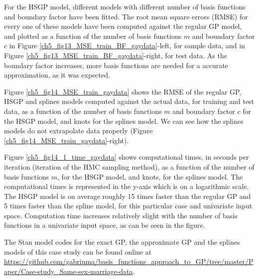 \documentclass[onecolumn,a4paper,11pt]{article}
\begin{document}
For the HSGP model, different models with different number of basis functions and boundary factor have been fitted. The root mean square errors (RMSE) for every one of these models have been computed against the regular GP model, and plotted as a function of the number of basis functions $m$ and boundary factor $c$ in Figure \ref{ch5_fig13_MSE_train_BF_gaydata}-left, for sample data, and in Figure \ref{ch5_fig13_MSE_train_BF_gaydata}-right, for test data. As the boundary factor increases, more basis functions are needed for a accurate approximation, as it was expected.

Figure \ref{ch5_fig14_MSE_train_gaydata} shows the RMSE of the regular GP, HSGP and splines models computed against the actual data, for training and test data, as a function of the number of basis functions $m$ and boundary factor $c$ for the HSGP model, and  knots for the splines model. We can see how the splines models do not extrapolate data properly (Figure \ref{ch5_fig14_MSE_train_gaydata}-right). 

Figure \ref{ch5_fig14_1_time_gaydata} shows computational times, in seconds per iteration (iteration of the HMC sampling method), as a function of the number of basis functions $m$, for the HSGP model, and knots, for the splines model. The computational times is represented in the y-axis which is on a logarithmic scale. The HSGP model is on average roughly 15 times faster than the regular GP and 5 times faster than the spline model, for this particular case and univariate input space. Computation time increases relatively slight with the number of basis functions in a univariate input space, as can be seen in the figure.

The Stan model codes for the exact GP, the approximate GP and the splines models of this case study can be found online at {\small \url{https://github.com/gabriuma/basis_functions_approach_to_GP/tree/master/Paper/Case-study_Same-sex-marriage-data}}.

\end{document}
